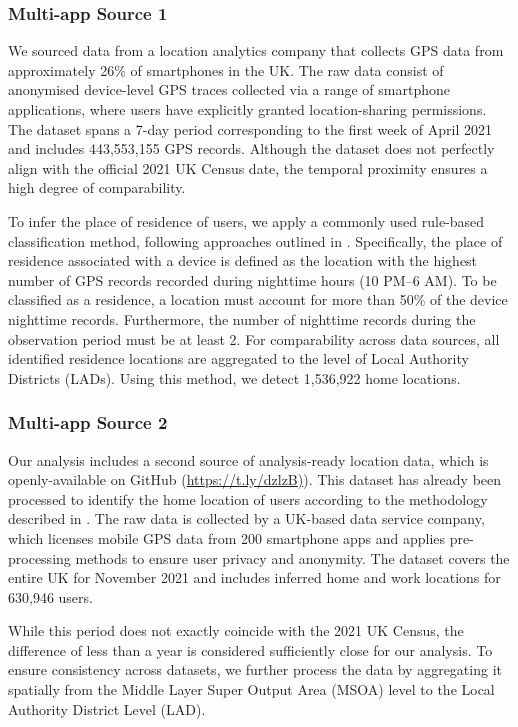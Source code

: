 \documentclass[]{rsos}%
\begin{document}
\subsubsection{Multi-app Source 1}\label{multi-app-source-1}

We sourced data from a location analytics company that collects GPS data from approximately 26\% of smartphones in the UK. The raw data consist of anonymised device-level GPS traces collected via a range of smartphone applications, where users have explicitly granted location-sharing permissions. The dataset spans a 7-day period corresponding to the first week of April 2021 and includes 443,553,155 GPS records. Although the dataset does not perfectly align with the official 2021 UK Census date, the temporal proximity ensures a high degree of comparability.

To infer the place of residence of users, we apply a commonly used rule-based classification method, following approaches outlined in \citep{wang2022, zhong24working}. Specifically, the place of residence associated with a device is defined as the location with the highest number of GPS records recorded during nighttime hours (10 PM--6 AM). To be classified as a residence, a location must account for more than 50\% of the device nighttime records. Furthermore, the number of nighttime records during the observation period must be at least 2. For comparability across data sources, all identified residence locations are aggregated to the level of Local Authority Districts (LADs). Using this method, we detect 1,536,922 home locations.

\subsubsection{Multi-app Source 2}\label{multi-app-source-2}

Our analysis includes a second source of analysis-ready location
data, which is openly-available on GitHub
(\href{https://t.ly/dzlzB}{https://t.ly/dzlzB)}). This dataset has already
been processed to identify the home location of users according to the
methodology described in \citep{zhong24working}. The raw data is collected by
a UK-based data service company, which licenses mobile GPS data from 200
smartphone apps and applies pre-processing methods to ensure user
privacy and anonymity. The dataset covers the entire UK for November 2021 and includes inferred home and work locations for 630,946 users.

While this period does not exactly coincide with the 2021 UK Census, the
difference of less than a year is considered sufficiently close for our
analysis. To ensure consistency across datasets, we further process the data by aggregating it spatially from the Middle Layer Super Output Area (MSOA) level to the Local Authority District Level (LAD).
\end{document}
